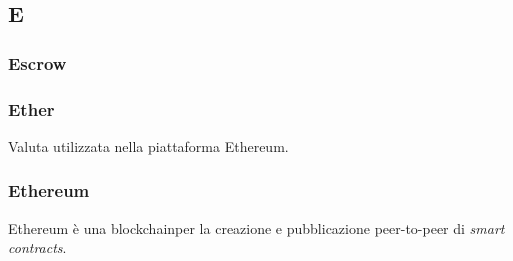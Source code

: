 \subsection*{\textbf{\hfill \Huge{E} \hfill}} 
\subsubsection*{Escrow}

\subsubsection*{Ether}
Valuta utilizzata nella piattaforma Ethereum.
\subsubsection*{Ethereum}
Ethereum è una blockchain\glo per la creazione e pubblicazione peer-to-peer di  \textit{smart contracts}\glos.
